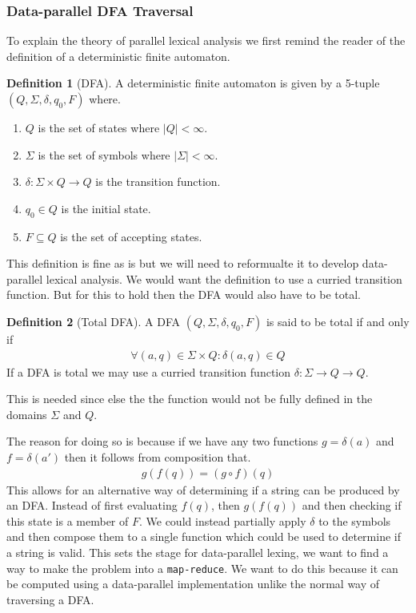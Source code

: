 \documentclass[a4paper,12pt]{article}
\theoremstyle{definition}
\newtheorem{definition}{Definition}[section]
\begin{document}
\subsubsection{Data-parallel DFA Traversal}
To explain the theory of parallel lexical analysis we first remind the reader of the definition of a deterministic finite automaton.
\begin{definition}[DFA]
  A deterministic finite automaton \cite{10.5555/1196416} \cite{enwiki:1192025610} is given by a 5-tuple $(Q, \Sigma, \delta, q_0, F)$ where.
  \begin{enumerate}
    \item $Q$ is the set of states where $|Q| < \infty$.
    \item $\Sigma$ is the set of symbols where $|\Sigma| < \infty$.
    \item $\delta: \Sigma \times Q \to Q$ is the transition function.
    \item $q_0 \in Q$ is the initial state.
    \item $F\subseteq Q$ is the set of accepting states.
  \end{enumerate}
\end{definition}
\noindent This definition is fine as is but we will need to reformualte it to develop data-parallel lexical analysis. We would want the definition to use a curried transition function. But for this to hold then the DFA would also have to be total.
\begin{definition}[Total DFA]
  A DFA $(Q, \Sigma, \delta, q_0, F)$ is said to be total if and only if
  \begin{align*}
    \forall (a, q) \in \Sigma \times Q: \delta(a, q) \in Q 
  \end{align*}
  If a DFA is total we may use a curried transition function $\delta: \Sigma \to Q \to Q$.
\end{definition}
\noindent This is needed since else the the function would not be fully defined in the domains $\Sigma$ and $Q$.

The reason for doing so is because if we have any two functions $g = \delta(a)$ and $f = \delta(a')$ then it follows from composition that.
\begin{align*}
  g(f(q)) = (g \circ f) (q)
\end{align*}
This allows for an alternative way of determining if a string can be produced by an DFA. Instead of first evaluating $f(q)$, then $g(f(q))$ and then checking if this state is a member of $F$. We could instead partially apply $\delta$ to the symbols and then compose them to a single function which could be used to determine if a string is valid. This sets the stage for data-parallel lexing, we want to find a way to make the problem into a \texttt{map-reduce}. We want to do this because it can be computed using a data-parallel implementation unlike the normal way of traversing a DFA.
\end{document}
